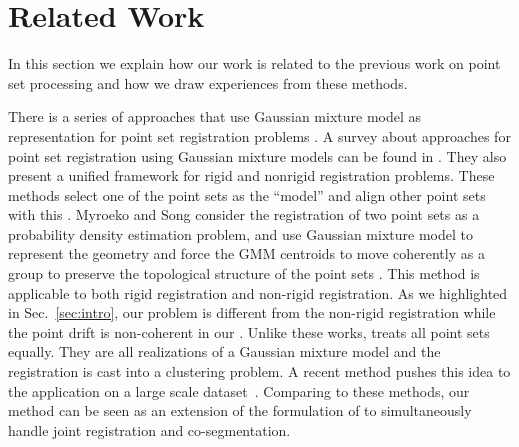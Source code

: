 \section{Related Work}
\label{sec:rw}
In this section we explain how our work is related to the previous work on point set processing and how we draw experiences from these methods. 

There is a series of approaches that use Gaussian mixture model as  representation for point set registration problems .
%
%
A  survey about approaches for point set registration using Gaussian mixture models can be found in \cite{GMM_PAMI}. 
They also present a unified framework for rigid and nonrigid registration problems. 
%
These methods select one of the point sets as the ``model'' and align other point sets with this .  
%
Myroeko and Song consider the registration of two point sets as a probability density estimation problem, and use Gaussian mixture model to represent the geometry and force the GMM centroids to move coherently as a group to preserve the topological structure of the point sets \cite{CPD}. This method is applicable to both rigid registration and non-rigid registration. 
%
As we highlighted in Sec.~\ref{sec:intro}, our problem is different from the non-rigid registration while the point drift is non-coherent in our .
%
Unlike these works, \cite{Evangelidis2014} treats all point sets equally.
They are all realizations of a Gaussian mixture model and the registration is cast into a clustering problem. 
A recent method pushes this idea to the application on a large scale dataset~\cite{GOGMA}. 
Comparing to these methods, our method can be seen as an extension of the formulation of \cite{Evangelidis2014} to simultaneously handle joint registration and co-segmentation. 
 

